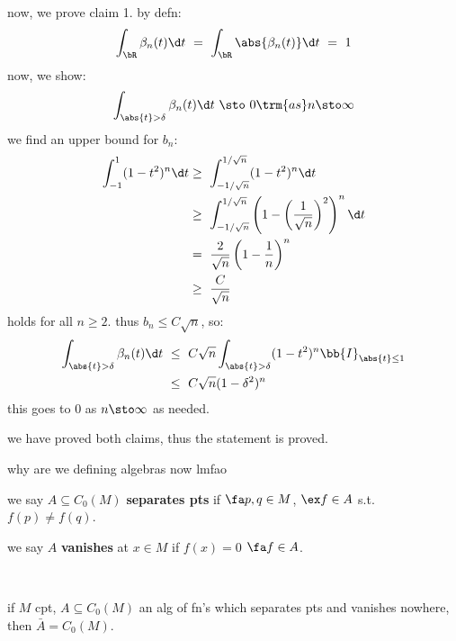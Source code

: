 \begin{pf}[source=Primary Source Material]
	now, we prove claim 1. by defn:
	\begin{equation*}
		\int_{\bR}\beta_{n}(t)\d t
		\ = \ \int_{\bR}\abs{\beta_{n}(t)}\d t \ = \ 1
	\end{equation*}
	now, we show:
	\begin{equation*}
		\int_{\abs{t}>\delta}\beta_{n}(t)\d t \ \sto \ 0 \trm{ as } n\sto\infty
	\end{equation*}
	we find an upper bound for $b_{n}$:
	\begin{align*}
		\int_{-1}^{1}(1-t^{2})^{n}\d t
		& \geq \ \int_{-1/\sqrt{n}}^{1/\sqrt{n}}(1-t^{2})^{n}\d t \\
		& \geq \ \int_{-1/\sqrt{n}}^{1/\sqrt{n}}\left(1-\left(\frac{1}{\sqrt{n}}\right)^{2}\right)^{n}\d t \\
		& = \ \frac{2}{\sqrt{n}}\left(1-\frac{1}{n}\right)^{n} \\
		& \geq \ \frac{C}{\sqrt{n}}
	\end{align*}
	holds for all $n\geq2$. thus $b_{n}\leq C\sqrt{n}$, so:
	\begin{align*}
		\int_{\abs{t}>\delta}\beta_{n}(t)\d t
		& \ \leq \ C\sqrt{n}\int_{\abs{t}>\delta}(1-t^{2})^{n}\bb{I}_{\abs{t}\leq1} \\
		& \ \leq \ C\sqrt{n}(1-\delta^{2})^{n}
	\end{align*}
	this goes to 0 as $n\sto\infty$ as needed.

	we have proved both claims, thus the statement is proved.
\end{pf}

why are we defining algebras now lmfao

\begin{defn}
	we say $A\subseteq C_{0}(M)$ \textbf{separates pts} if $\fa p,q\in M$, $\ex f\in A$ s.t.
	$f(p)\neq f(q)$.

	we say $A$ \textbf{vanishes} at $x\in M$ if $f(x)=0$ $\fa f\in A$.
\end{defn} \

\begin{thm}[title=Stone-Weierstrass]
	if $M$ cpt, $A\subseteq C_{0}(M)$ an alg of fn's which separates pts and
	vanishes nowhere, then $\bar{A}=C_{0}(M)$.
\end{thm}



